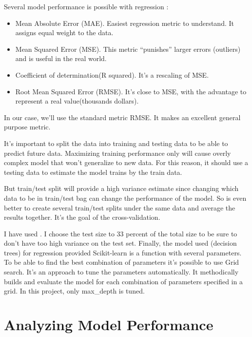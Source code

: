 \documentclass{article}
\begin{document}
Several model performance is possible with regression : 
 
\begin{itemize}
\item Mean Absolute Error (MAE). Easiest regression metric to understand. It assigns equal weight to the data.
\item Mean Squared Error (MSE). This metric "`punishes"' larger errors (outliers) and is useful in the real world.
\item Coefficient of determination(R squared). It's a rescaling of MSE.
\item Root Mean Squared Error (RMSE). It's close to MSE, with the advantage to represent a real value(thousands dollars).
\end{itemize}
In our case, we'll use the standard metric RMSE. It makes an excellent general purpose metric.

\par It's important to split the data into training and testing data to be able to predict future data. Maximizing training performance only will cause overly complex model that won't generalize to new data. For this reason, it should use a testing data to estimate the model trains by the train data. 
\par But train/test split will provide a high variance estimate since changing which data to be in train/test bag can change the performance of the model. So is even better to create several train/test splits under the same data and average the results together. It's the goal of the cross-validation.
\par I have used .
I choose the test size to \num{33} percent of the total size to be sure to don't have too high variance on the test set.
Finally, the model used (decision trees) for regression provided Scikit-learn  is a function with several parameters. To be able to find the best combination of parameters it's possible to use Grid search. It's an approach to tune the parameters automatically. It methodically builds and evaluate the model for each combination of parameters specified in a grid. In this project, only max_depth is tuned.


\section{Analyzing Model Performance}
\end{document}
